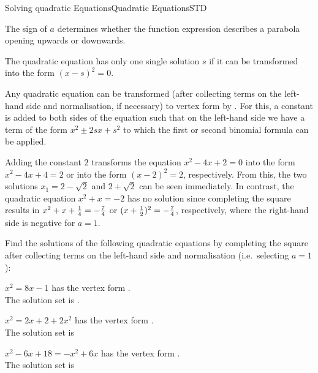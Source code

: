 \begin{MXContent}{Solving quadratic Equations}{Quadratic Equations}{STD}
\begin{MInfo}
The sign of $a$ determines whether the function expression describes a parabola 
opening upwards or downwards. 
\end{MInfo}

The quadratic equation has only one single solution $s$ if it can be transformed into the form
$(x-s)^2=0$.

\begin{MInfo}

Any quadratic equation can be transformed (after collecting terms on the left-hand side
and normalisation, if necessary) to vertex form by 
. For this, a constant is
added to both sides of the equation such that on the left-hand side we have a term of the 
form $x^2\pm 2s x+s^2$ to which the first or second binomial formula can be applied.
\end{MInfo}

\begin{MExample}
Adding the constant $2$ transforms the equation $x^2-4x+2=0$ into the
form $x^2-4x+4=2$ or into the form $(x-2)^2=2$, respectively. From this,
the two solutions $x_1=2-\sqrt{2}$ and $2+\sqrt{2}$ can be seen immediately.
In contrast, the quadratic equation $x^2+x=-2$ has no solution since completing
the square results in $x^2+x+\tfrac{1}{4}=-\tfrac{7}{4}$ or $(x+\tfrac{1}{2})^2=-\tfrac{7}{4}$, respectively, 
where the right-hand side is negative for $a=1$.
\end{MExample}

\begin{MExercise}
Find the solutions of the following quadratic equations by completing the square after 
collecting terms on the left-hand side and normalisation (i.e.\ selecting $a=1$):

\begin{MExerciseItems}
\item{$x^2=8x-1$ has the vertex form .\\The solution set is .}
\item{$x^2=2x+2+2x^2$ has the vertex form .\\The solution set is }
\item{$x^2-6x+18=-x^2+6x$ has the vertex form .\\The solution set is }
\end{MExerciseItems}


\end{MExercise}
\end{MXContent}
